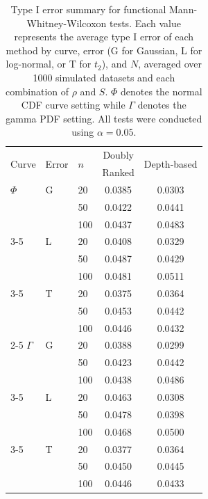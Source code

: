 \documentclass[12pt]{article}
\theoremstyle{plain}
\begin{document}
\begin{table}
\centering
\caption{Type I error summary for functional Mann-Whitney-Wilcoxon tests. Each value represents the average type I error of each method by curve, error (G for Gaussian, L for log-normal, or T for $t_2$), and $N$, averaged over 1000 simulated datasets and each combination of $\rho$ and $S$. $\Phi$ denotes the normal CDF curve setting while $\Gamma$ denotes the gamma PDF setting. All tests were conducted using $\alpha = 0.05$. \label{t:mwwe}  }
\vspace{5pt}
\begin{tabular}{lllcc}
  \hline
\multirow{2}{*}{Curve} & \multirow{2}{*}{Error} & \multirow{2}{*}{$n$} &  Doubly & \multirow{2}{*}{Depth-based}  \\
 &   &  & Ranked &  \\ 
  \hline
$\Phi$ & 
G  &  20 & 0.0385 & 0.0303   \\
 & & 50 & 0.0422 & 0.0441   \\
 & & 100 & 0.0437 & 0.0483   \\
\cline{3-5}
& L & 20 & 0.0408 & 0.0329  \\
 & & 50 & 0.0487 & 0.0429  \\ 
 & & 100 & 0.0481 & 0.0511  \\
\cline{3-5}
& T & 20 & 0.0375 & 0.0364  \\
 & & 50 & 0.0453 & 0.0442  \\
 & & 100  & 0.0446 & 0.0432  \\
\cline{2-5}
$\Gamma$ & G  &  20 & 0.0388 & 0.0299   \\
 & & 50 & 0.0423 & 0.0442  \\
 & & 100 & 0.0438 & 0.0486  \\
\cline{3-5}
& L  &  20 & 0.0463 & 0.0308  \\ 
 & & 50 & 0.0478 & 0.0398  \\ 
 & & 100 & 0.0468 & 0.0500  \\ 
\cline{3-5}
& T & 20 & 0.0377 & 0.0364  \\
 & & 50 & 0.0450 & 0.0445  \\
 & & 100 & 0.0446 & 0.0433   \\
    \hline
\end{tabular}
\end{table}
\end{document}
